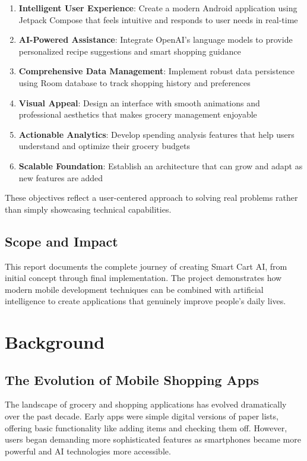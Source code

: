 \documentclass[11pt,a4paper]{article}
\begin{document}
\begin{enumerate}
    \item \textbf{Intelligent User Experience}: Create a modern Android application using Jetpack Compose that feels intuitive and responds to user needs in real-time
    \item \textbf{AI-Powered Assistance}: Integrate OpenAI's language models to provide personalized recipe suggestions and smart shopping guidance
    \item \textbf{Comprehensive Data Management}: Implement robust data persistence using Room database to track shopping history and preferences
    \item \textbf{Visual Appeal}: Design an interface with smooth animations and professional aesthetics that makes grocery management enjoyable
    \item \textbf{Actionable Analytics}: Develop spending analysis features that help users understand and optimize their grocery budgets
    \item \textbf{Scalable Foundation}: Establish an architecture that can grow and adapt as new features are added
\end{enumerate}

These objectives reflect a user-centered approach to solving real problems rather than simply showcasing technical capabilities.

\subsection{Scope and Impact}

This report documents the complete journey of creating Smart Cart AI, from initial concept through final implementation. The project demonstrates how modern mobile development techniques can be combined with artificial intelligence to create applications that genuinely improve people's daily lives.

\section{Background}

\subsection{The Evolution of Mobile Shopping Apps}

The landscape of grocery and shopping applications has evolved dramatically over the past decade. Early apps were simple digital versions of paper lists, offering basic functionality like adding items and checking them off. However, users began demanding more sophisticated features as smartphones became more powerful and AI technologies more accessible.
\end{document}
